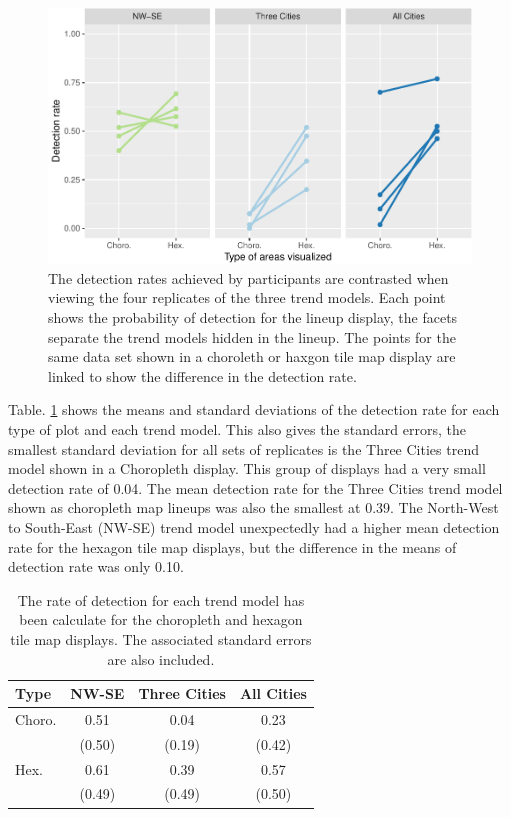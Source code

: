\documentclass[conference,final,]{IEEEtran}
\makeatletter
\def\maxwidth{\ifdim\Gin@nat@width>\linewidth\linewidth
\else\Gin@nat@width\fi}
\let\Oldincludegraphics\includegraphics
\renewcommand{\includegraphics}[1]{\Oldincludegraphics[width=\maxwidth]{#1}}
\makeatother
\begin{document}
\begin{figure}
\centering
\includegraphics{paper_files/figure-latex/detect-compare-1.pdf}
\caption{\label{fig:detect-compare}The detection rates achieved by participants are contrasted when viewing the four replicates of the three trend models. Each point shows the probability of detection for the lineup display, the facets separate the trend models hidden in the lineup. The points for the same data set shown in a choroleth or haxgon tile map display are linked to show the difference in the detection rate.}
\end{figure}

Table. \ref{tab:desc-stats} shows the means and standard deviations of the detection rate for each type of plot and each trend model. This also gives the standard errors, the smallest standard deviation for all sets of replicates is the Three Cities trend model shown in a Choropleth display. This group of displays had a very small detection rate of 0.04. The mean detection rate for the Three Cities trend model shown as choropleth map lineups was also the smallest at 0.39.
The North-West to South-East (NW-SE) trend model unexpectedly had a higher mean detection rate for the hexagon tile map displays, but the difference in the means of detection rate was only 0.10.

\begin{table}

\caption{\label{tab:desc-stats}The rate of detection for each trend model has been calculate for the choropleth and hexagon tile map displays. The associated standard errors are also included.}
\centering
\begin{tabular}[t]{lccc}
\toprule
Type & NW-SE & Three Cities & All Cities\\
\midrule
Choro. & 0.51 & 0.04 & 0.23\\
 & (0.50) & (0.19) & (0.42)\\
\addlinespace
Hex. & 0.61 & 0.39 & 0.57\\
 & (0.49) & (0.49) & (0.50)\\
\bottomrule
\end{tabular}
\end{table}
\end{document}
